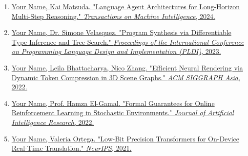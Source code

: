 \vspace{2mm}

\begin{enumerate}

\item \href{https://example.com/paper1}{
Your Name, Kai Matsuda.  
"Language Agent Architectures for Long-Horizon Multi-Step Reasoning."  
\textit{Transactions on Machine Intelligence}, 2024.}

\item \href{https://example.com/paper2}{
Your Name, Dr. Simone Velasquez.  
"Program Synthesis via Differentiable Type Inference and Tree Search."  
\textit{Proceedings of the International Conference on Programming Language Design and Implementation (PLDI)}, 2023.}

\item \href{https://example.com/paper3}{
Your Name, Leila Bhattacharya, Nico Zhang.  
"Efficient Neural Rendering via Dynamic Token Compression in 3D Scene Graphs."  
\textit{ACM SIGGRAPH Asia}, 2022.}

\item \href{https://example.com/paper4}{
Your Name, Prof. Hamza El-Gamal.  
"Formal Guarantees for Online Reinforcement Learning in Stochastic Environments."  
\textit{Journal of Artificial Intelligence Research}, 2022.}

\item \href{https://example.com/paper5}{
Your Name, Valeria Ortega.  
"Low-Bit Precision Transformers for On-Device Real-Time Translation."  
\textit{NeurIPS}, 2021.}

\end{enumerate}
